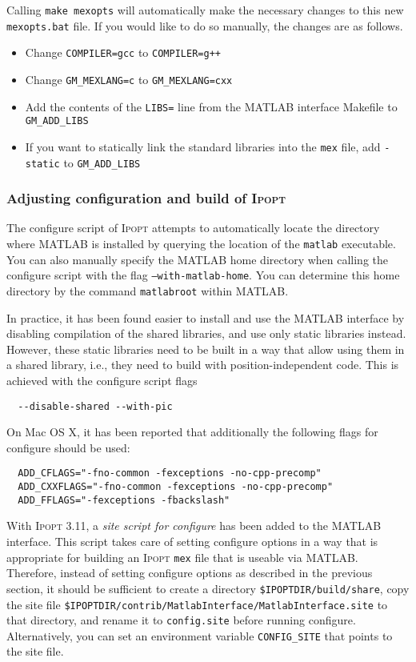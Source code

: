 \documentclass[10pt]{article}
\newcommand{\Ipopt}{\textsc{Ipopt}\xspace}
\newcommand{\Matlab}{\textsc{MATLAB}\xspace}
\begin{document}
Calling {\tt make mexopts} will automatically make the necessary changes to this
new {\tt mexopts.bat} file. If you would like to do so manually, the changes are
as follows.
\begin{itemize}
\item Change {\tt COMPILER=gcc} to {\tt COMPILER=g++}
\item Change {\tt GM\_MEXLANG=c} to {\tt GM\_MEXLANG=cxx}
\item Add the contents of the {\tt LIBS=} line from the \Matlab interface Makefile
to {\tt GM\_ADD\_LIBS}
\item If you want to statically link the standard libraries into the 
{\tt mex} file, add {\tt -static} to {\tt GM\_ADD\_LIBS}
\end{itemize}

\subsubsection{Adjusting configuration and build of \Ipopt}

The configure script of \Ipopt attempts to automatically locate the directory 
where \Matlab is installed by querying the location of the {\tt matlab} 
executable. You can also manually specify the \Matlab home directory when 
calling the configure script with the flag {\tt --with-matlab-home}. You can
determine this home directory by the command {\tt matlabroot} within \Matlab.


In practice, it has been found easier to install and use the \Matlab interface 
by disabling compilation of the shared libraries, and use only static 
libraries instead. However, these static libraries need to be built in a way 
that allow using them in a shared library, i.e., they need to build with 
position-independent code.
This is achieved with the configure script flags
\begin{verbatim}
  --disable-shared --with-pic
\end{verbatim}
On Mac OS X, it has been reported that additionally the following flags for 
configure should be used:
\begin{verbatim}
  ADD_CFLAGS="-fno-common -fexceptions -no-cpp-precomp"
  ADD_CXXFLAGS="-fno-common -fexceptions -no-cpp-precomp"
  ADD_FFLAGS="-fexceptions -fbackslash" 
\end{verbatim}

With \Ipopt 3.11, a \emph{site script for configure} has been added to the 
\Matlab interface. This script takes care of setting configure options in a 
way that is appropriate for building an \Ipopt { \tt mex} file that is useable via
\Matlab. Therefore, instead of setting configure options as described in the 
previous section, it should be sufficient to create a directory {\tt \$IPOPTDIR/build/share}, copy the site file {\tt \$IPOPTDIR/contrib/MatlabInterface/MatlabInterface.site} to that directory, and rename it to {\tt config.site} before running configure.
Alternatively, you can set an environment variable 
{\tt CONFIG\_SITE} that points to the site file.
\end{document}
